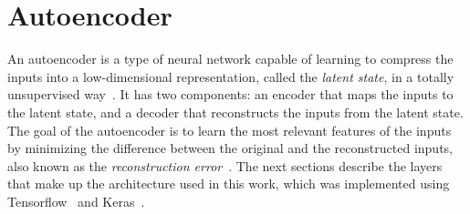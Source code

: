 \begin{table}
\centering
{}
\caption{Activation details for each appliance}
\label{tab:activation_details}
\end{table}

\section{Autoencoder}

An autoencoder is a type of neural network capable of learning to compress the inputs into a low-dimensional representation, called the \textit{latent state}, in a totally unsupervised way~\parencite{hinton_reducing_2006}. It has two components: an encoder that maps the inputs to the latent state, and a decoder that reconstructs the inputs from the latent state. The goal of the autoencoder is to learn the most relevant features of the inputs by minimizing the difference between the original and the reconstructed inputs, also known as the \textit{reconstruction error}~\parencite{hinton_reducing_2006}. The next sections describe the layers that make up the architecture used in this work, which was implemented using Tensorflow~\parencite{abadi_tensorflow_2016,developers_tensorflow_2023} and Keras~\parencite{chollet_keras_2015}.

